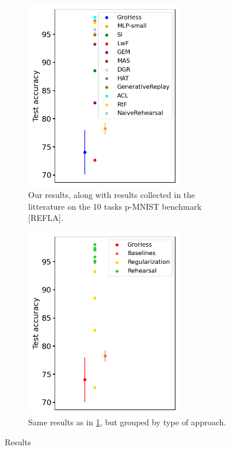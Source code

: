 \documentclass[11pt]{article}
\begin{document}
\begin{figure}
    \centering
    \begin{subfigure}[b]{0.4\textwidth}
        \centering
        \includegraphics[width=0.75\textwidth]{images/lit.png}
        \caption{Our results, along with results collected in the litterature on the 10 tasks p-MNIST benchmark [REFLA].}
        \label{fig:results}
    \end{subfigure}
    \hspace{-0mm}
    \begin{subfigure}[b]{0.4\textwidth}
        \centering
        \includegraphics[width=0.75\textwidth]{images/lit_grouped.png}
        \caption{Same results as in \ref{fig:results}, but grouped by type of approach.}
        \label{fig:results_grouped}
    \end{subfigure}
    \caption{Results}
\end{figure}
\end{document}
